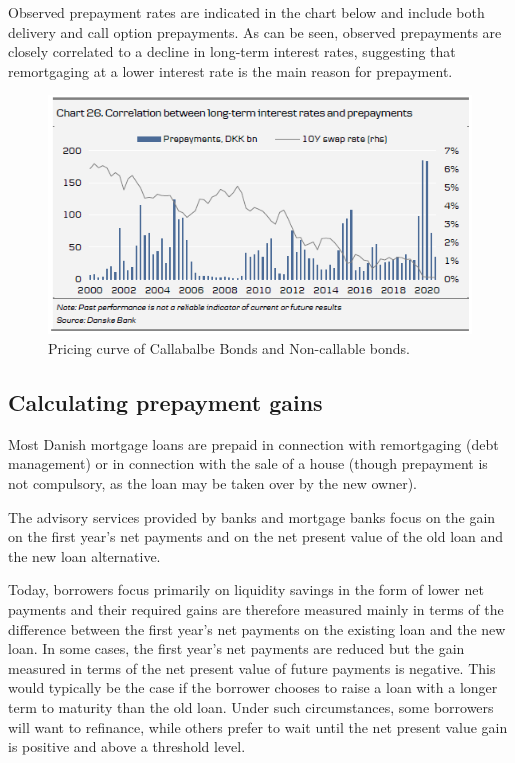 \documentclass[12pt,twoside]{reedthesis}
\begin{document}
Observed prepayment rates are indicated in the chart below and include both delivery and call option prepayments. As can be seen, observed prepayments are closely correlated to a decline in long-term interest rates, suggesting that remortgaging at a lower interest rate is the main reason for prepayment.
\begin{figure}

{\centering \includegraphics[width=1\linewidth]{figure/Interest_rate_and_prepayment_correlation} 

}

\caption{Pricing curve of Callabalbe Bonds and Non-callable bonds.}\label{fig:prepaymentvsswap}
\end{figure}
\hypertarget{calculating-prepayment-gains}{%
\subsection{Calculating prepayment gains}\label{calculating-prepayment-gains}}

Most Danish mortgage loans are prepaid in connection with remortgaging (debt management) or in connection with the sale of a house (though prepayment is not compulsory, as the loan may be taken over by the new owner).

The advisory services provided by banks and mortgage banks focus on the gain on the first year's net payments and on the net present value of the old loan and the new loan alternative.

Today, borrowers focus primarily on liquidity savings in the form of lower net payments and their required gains are therefore measured mainly in terms of the difference between the first year's net payments on the existing loan and the new loan. In some cases, the first year's net payments are reduced but the gain measured in terms of the net present value of future payments is negative. This would typically be the case if the borrower chooses to raise a loan with a longer term to maturity than the old loan. Under such circumstances, some borrowers will want to refinance, while others prefer to wait until the net present value gain is positive and above a threshold level.
\end{document}
